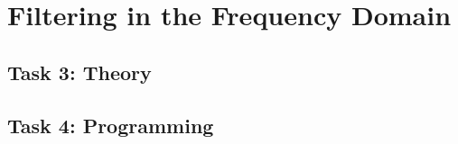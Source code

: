 \section{Filtering in the Frequency Domain}
\subsection{Task 3: Theory}

\newpage
\subsection{Task 4: Programming}
